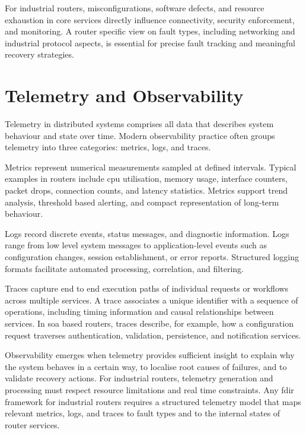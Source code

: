For industrial routers, misconfigurations, software defects, and resource exhaustion in core services directly influence connectivity, security enforcement, and monitoring. A router specific view on fault types, including networking and industrial protocol aspects, is essential for precise fault tracking and meaningful recovery strategies.

\section{Telemetry and Observability}\label{sec:telemetry-observability}

Telemetry in distributed systems comprises all data that describes system behaviour and state over time. Modern observability practice often groups telemetry into three categories: metrics, logs, and traces.

Metrics represent numerical measurements sampled at defined intervals. Typical examples in routers include \gls{cpu} utilisation, memory usage, interface counters, packet drops, connection counts, and latency statistics. Metrics support trend analysis, threshold based alerting, and compact representation of long-term behaviour.

Logs record discrete events, status messages, and diagnostic information. Logs range from low level system messages to application-level events such as configuration changes, session establishment, or error reports. Structured logging formats facilitate automated processing, correlation, and filtering.

Traces capture end to end execution paths of individual requests or workflows across multiple services. A trace associates a unique identifier with a sequence of operations, including timing information and causal relationships between services. In \gls{soa} based routers, traces describe, for example, how a configuration request traverses authentication, validation, persistence, and notification services.

Observability emerges when telemetry provides sufficient insight to explain why the system behaves in a certain way, to localise root causes of failures, and to validate recovery actions. For industrial routers, telemetry generation and processing must respect resource limitations and real time constraints. Any \gls{fdir} framework for industrial routers requires a structured telemetry model that maps relevant metrics, logs, and traces to fault types and to the internal states of router services.

